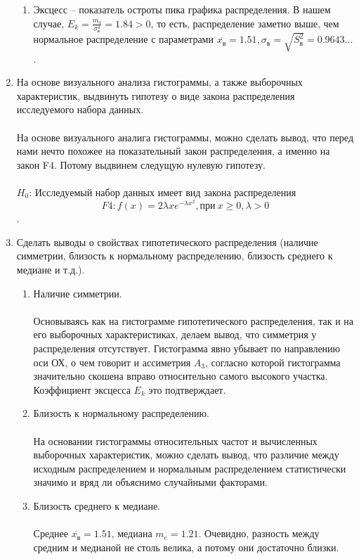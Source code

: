 \documentclass[12pt, letterpaper, twoside]{article}
\begin{document}
\begin{enumerate}
\begin{enumerate}
		\item Эксцесс -- показатель остроты пика графика распределения. В нашем случае, $E_k = \frac{m_4}{\sigma_{\text{в}}^4} = 1.84 > 0$, то есть, распределение заметно выше, чем нормальное распределение с параметрами $\overline{x_{\text{в}}} = 1.51, \sigma_{\text{в}} = \sqrt{S_{\text{в}}^2} = 0.9643...$.
	\end{enumerate}
	\item На основе визуального анализа гистограммы, а также выборочных характеристик, выдвинуть гипотезу о виде закона распределения исследуемого набора данных. \\ \\
	На основе визуального аналига гистограммы, можно сделать вывод, что перед нами нечто похожее на показательный закон распределения, а именно на закон F4. Потому выдвинем следущую нулевую гипотезу.\\ \\ $H_0$: Исследуемый набор данных имеет вид закона распределения $$F4: f(x) = 2\lambda xe^{-\lambda x^2}, \text{при} \ x \geq 0, \lambda > 0$$.
	\item Сделать выводы о свойствах гипотетического распределения (наличие симметрии, близость к нормальному распределению, близость среднего к медиане и т.д.).
	\begin{enumerate} 
		\item Наличие симметрии. \\ \\
		Основываясь как на гистограмме гипотетического распределения, так и на его выборочных характеристиках, делаем вывод, что симметрия у распределения отсутствует. Гистограмма явно убывает по направлению оси ОХ, о чем говорит и ассиметрия $A_3$, согласно которой гистограмма значительно скошена вправо относительно самого высокого участка. Коэффициент эксцесса $E_k$ это подтверждает.
		\item Близость к нормальному распределению. \\ \\
		На основании гистограммы относительных частот и вычисленных выборочных характеристик, можно сделать вывод, что различие между исходным распределением и нормальным распределением статистически значимо и вряд ли объяснимо случайными факторами.
		\item Близость среднего к медиане. \\ \\
		Среднее $\overline{x_{\text{в}}} = 1.51$, медиана $m_e = 1.21$. Очевидно, разность между средним и медианой не столь велика, а потому они достаточно близки.
	\end{enumerate} 
\end{enumerate}
\end{document}
